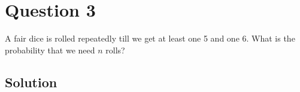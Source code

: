 \section*{Question 3}

A fair dice is rolled repeatedly till we get at least one 5 and one 6.
What is the probability that we need \(n\) rolls?

\subsection*{Solution}

